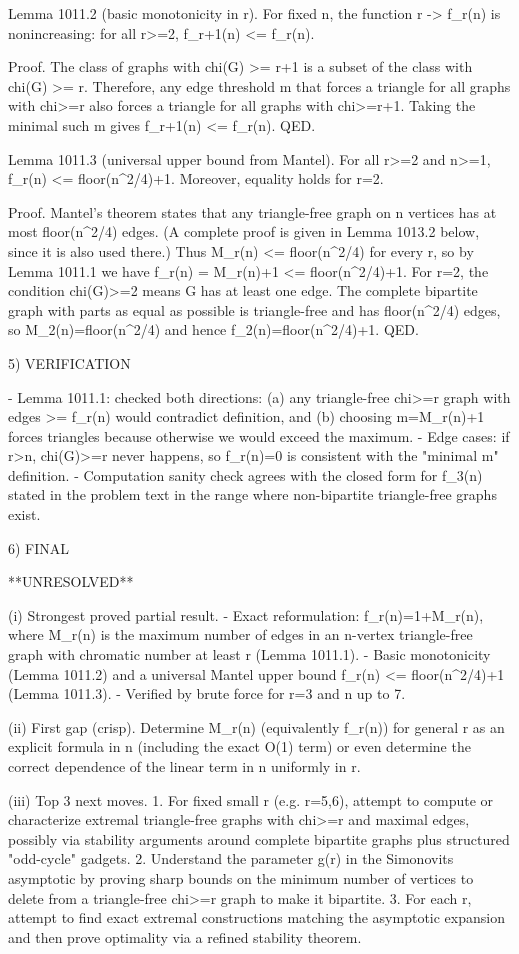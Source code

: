 Lemma 1011.2 (basic monotonicity in r).
For fixed n, the function r -> f_r(n) is nonincreasing: for all r>=2,
  f_{r+1}(n) <= f_r(n).

Proof.
The class of graphs with chi(G) >= r+1 is a subset of the class with chi(G) >= r.
Therefore, any edge threshold m that forces a triangle for all graphs with chi>=r also forces a triangle for all graphs with chi>=r+1. Taking the minimal such m gives f_{r+1}(n) <= f_r(n).
QED.

Lemma 1011.3 (universal upper bound from Mantel).
For all r>=2 and n>=1,
  f_r(n) <= floor(n^2/4)+1.
Moreover, equality holds for r=2.

Proof.
Mantel's theorem states that any triangle-free graph on n vertices has at most floor(n^2/4) edges. (A complete proof is given in Lemma 1013.2 below, since it is also used there.)
Thus M_r(n) <= floor(n^2/4) for every r, so by Lemma 1011.1 we have f_r(n) = M_r(n)+1 <= floor(n^2/4)+1.
For r=2, the condition chi(G)>=2 means G has at least one edge. The complete bipartite graph with parts as equal as possible is triangle-free and has floor(n^2/4) edges, so M_2(n)=floor(n^2/4) and hence f_2(n)=floor(n^2/4)+1.
QED.

5) VERIFICATION

- Lemma 1011.1: checked both directions: (a) any triangle-free chi>=r graph with edges >= f_r(n) would contradict definition, and (b) choosing m=M_r(n)+1 forces triangles because otherwise we would exceed the maximum.
- Edge cases: if r>n, chi(G)>=r never happens, so f_r(n)=0 is consistent with the "minimal m" definition.
- Computation sanity check agrees with the closed form for f_3(n) stated in the problem text in the range where non-bipartite triangle-free graphs exist.

6) FINAL

**UNRESOLVED**

(i) Strongest proved partial result.
- Exact reformulation: f_r(n)=1+M_r(n), where M_r(n) is the maximum number of edges in an n-vertex triangle-free graph with chromatic number at least r (Lemma 1011.1).
- Basic monotonicity (Lemma 1011.2) and a universal Mantel upper bound f_r(n) <= floor(n^2/4)+1 (Lemma 1011.3).
- Verified by brute force for r=3 and n up to 7.

(ii) First gap (crisp).
Determine M_r(n) (equivalently f_r(n)) for general r as an explicit formula in n (including the exact O(1) term) or even determine the correct dependence of the linear term in n uniformly in r.

(iii) Top 3 next moves.
1. For fixed small r (e.g. r=5,6), attempt to compute or characterize extremal triangle-free graphs with chi>=r and maximal edges, possibly via stability arguments around complete bipartite graphs plus structured "odd-cycle" gadgets.
2. Understand the parameter g(r) in the Simonovits asymptotic by proving sharp bounds on the minimum number of vertices to delete from a triangle-free chi>=r graph to make it bipartite.
3. For each r, attempt to find exact extremal constructions matching the asymptotic expansion and then prove optimality via a refined stability theorem.

